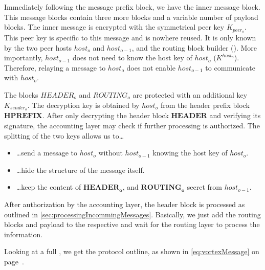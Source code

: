 Immediately following the message prefix block, we have the inner message block. This message blocks contain three more blocks and a variable number of payload blocks. The inner message is encrypted with the symmetrical peer key $K_{peer_o}$. This peer key is specific to this message and is nowhere reused. It is only known by the two peer hosts $host_o$ and $host_{o-1}$, and the routing block builder (). More importantly, $host_{o-1}$ does not need to know the host key of $host_o$ ($K^{host_o}$). Therefore, relaying a message to $host_o$ does not enable $host_{o-1}$ to communicate with $host_o$. 

The blocks $HEADER_o$ and $ROUTING_o$ are protected with an additional key $K_{sender_o}$. The decryption key is obtained by $host_o$ from the header prefix block $\mathbf{HPREFIX}$. After only decrypting the header block $\mathbf{HEADER}$ and verifying its signature, the accounting layer may check if further processing is authorized. The splitting of the two keys allows us to\ldots
\begin{itemize}
	\item \ldots send a message to $host_o$ without $host_{o-1}$ knowing the host key of $host_o$.
	\item \ldots hide the structure of the message itself.
	\item \ldots keep the content of $\mathbf{HEADER_o}$, and $\mathbf{ROUTING_o}$ secret from $host_{o-1}$.
\end{itemize}

After authorization by the accounting layer, the header block is processed as outlined in \cref{sec:processingIncommingMessages}. Basically, we just add the routing blocks and payload to the respective  and wait for the routing layer to process the information.

Looking at a full \VortexMessage, we get the protocol outline, as shown in \eqref{eq:vortexMessage} on page~\pageref{eq:vortexMessage}.

